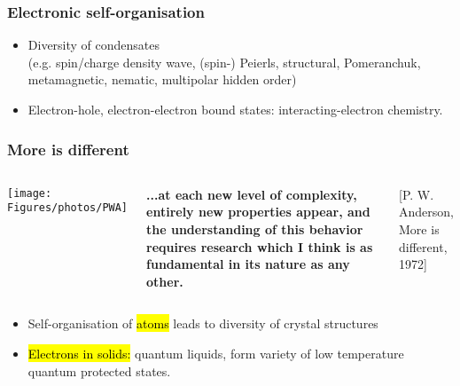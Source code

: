 
\begin{frame}[label=ElecStates]
\frametitle{Electronic self-organisation}

\centerline{}
\vspace{2ex}

\begin{itemize}
\item<visible@1-> Diversity of condensates\\ {\small (e.g. spin/charge
density wave, (spin-) Peierls, structural,
Pomeranchuk, metamagnetic, nematic, multipolar 
hidden order)}

\item<visible@1-> Electron-hole, electron-electron bound states: interacting-electron chemistry.

\end{itemize}

\end{frame}

\begin{frame}[label=Moredifferent]
\frametitle{More is different}

\begin{columns}[c]
\centerline{\texttt{[image: \\Figures/photos/PWA]}}

{\bf ...at each new level of complexity, entirely new properties
  appear, and the understanding of this behavior requires research
  which I think is as fundamental in its nature as any other.} \\

\centerline{\scriptsize [P. W. Anderson, More is different, 1972]}
\end{columns}
\vspace{2em}
\begin{itemize}
\item
Self-organisation of \hl{atoms} leads to diversity of crystal structures \\

\item
\hl{Electrons in solids:} quantum liquids, form variety
of low temperature quantum protected states.

\end{itemize}
\end{frame}



